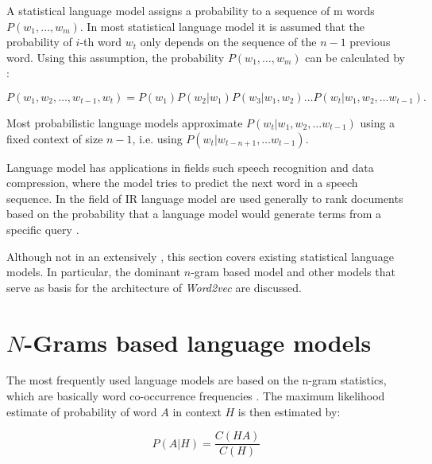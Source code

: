 A statistical language model assigns a probability to a sequence of m
words $P(w_1,\ldots,w_m)$.  In most statistical language model it is assumed
that the probability of $i$-th word $w_t$ only depends on the sequence of the
$n-1$ previous word.  Using this assumption, the probability
$P(w_1,\ldots,w_m)$ can be calculated by \cite{Bengio:2008}: 
% 


\begin{equation}
\label{eq:lm_probability}
 P(w_1, w_2, \ldots, w_{t-1},w_t) = P(w_1) P(w_2|w_1) P(w_3|w_1,w_2) \ldots 
  P(w_t | w_1, w_2, \ldots w_{t-1}).
\end{equation}

Most probabilistic language models  approximate $P(w_t | w_1, w_2, \ldots
w_{t-1})$ using a fixed context of size $n-1$, i.e. using  $P(w_t |
w_{t-n+1}, \ldots w_{t-1})$.

Language model has applications in fields such speech recognition and data
compression, where the model tries to predict the next word in a speech
sequence. In the field of \ac{IR} language model are used generally 
to rank documents based on the probability that a language model would
generate terms from a specific query \cite{Manning:1999:FSN:311445}.

Although not in an extensively , this section covers existing statistical
language models. In particular, the dominant $n$-gram based model and other  models that
serve as basis for the architecture of  \textit{Word2vec} are discussed.


\section{$N$-Grams based language models}
\label{sec:n-gram-lm}

The most frequently used language models are based on the n-gram statistics,
which are basically word co-occurrence
frequencies \cite{Manning:1999:FSN:311445} . The maximum likelihood estimate
of probability of word $A$ in context $H$ is then estimated by:


\begin{equation}
\label{eq:ngram-prob}
  P(A|H) = \frac{C(HA)}{C(H)}
\end{equation}


